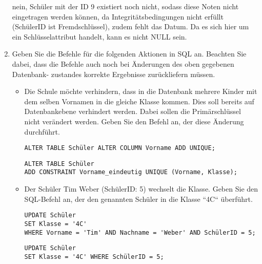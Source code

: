 \documentclass{lehramt-informatik-aufgabe}
\begin{document}
\begin{enumerate}
\begin{antwort}
nein, Schüler mit der ID 9 existiert noch nicht, sodass diese Noten
nicht eingetragen werden können, da Integritätsbedingungen nicht erfüllt
(SchülerID ist Fremdschlüssel), zudem fehlt das Datum. Da es sich
hier um ein Schlüsselattribut handelt, kann es nicht NULL sein.
\end{antwort}


\item Geben Sie die Befehle für die folgenden Aktionen in SQL an.
Beachten Sie dabei, dass die Befehle auch noch bei Änderungen des oben
gegebenen Datenbank- zustandes korrekte Ergebnisse zurückliefern müssen.

\begin{itemize}
\item Die Schule möchte verhindern, dass in die Datenbank mehrere Kinder
mit dem selben Vornamen in die gleiche Klasse kommen. Dies soll bereits
auf Datenbankebene verhindert werden. Dabei sollen die Primärschlüssel
nicht verändert werden. Geben Sie den Befehl an, der diese Änderung
durchführt.

\begin{antwort}[falsch]
\begin{verbatim}
ALTER TABLE Schüler ALTER COLUMN Vorname ADD UNIQUE;
\end{verbatim}
\end{antwort}

\begin{antwort}
\begin{verbatim}
ALTER TABLE Schüler
ADD CONSTRAINT Vorname_eindeutig UNIQUE (Vorname, Klasse);
\end{verbatim}
\end{antwort}

\item Der Schüler Tim Weber (SchülerID: 5) wechselt die Klasse. Geben
Sie den SQL-Befehl an, der den genannten Schüler in die Klasse “4C“
überführt.

\begin{antwort}[richtig]
\begin{verbatim}
UPDATE Schüler
SET Klasse = '4C'
WHERE Vorname = 'Tim' AND Nachname = 'Weber' AND SchülerID = 5;
\end{verbatim}
\end{antwort}

\begin{antwort}
\begin{verbatim}
UPDATE Schüler
SET Klasse = '4C' WHERE SchülerID = 5;
\end{verbatim}
\end{antwort}


\end{itemize}
\end{enumerate}
\end{document}
